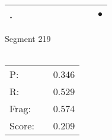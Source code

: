 \documentclass[landscape]{article}
\newcommand{\ssp}{\hspace{2pt}}
\newcommand{\mex}{\cellcolor{g}$\bullet$}
\begin{document}
\begin{tabular}{|l|p{10pt}|p{10pt}|p{10pt}|p{10pt}|p{10pt}|p{10pt}|p{10pt}|p{10pt}|p{10pt}|}
\hline
\ssp \cellcolor{ref8}. \ssp&\hspace{2pt}&\hspace{2pt}&\hspace{2pt}&\hspace{2pt}&\hspace{2pt}&\hspace{2pt}&\hspace{2pt}&\hspace{2pt}&\hspace{2pt}\mex\\
\hline
\end{tabular}

\vspace{6pt}
\noindent Segment 219\\\\
\noindent\begin{tabular}{lm{12pt}r}
\hline
P:&&0.346\\
R:&&0.529\\
Frag:&&0.574\\
Score:&&0.209\\
\end{tabular}

\newpage
\end{document}
